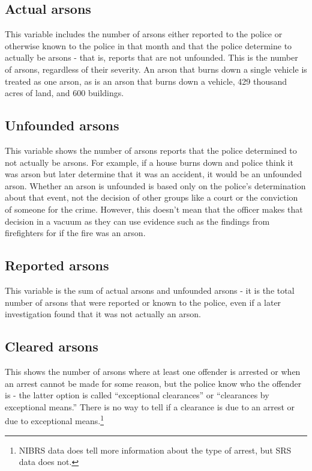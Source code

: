 \documentclass[
]{krantz}
\begin{document}
\subsection{Actual arsons}\label{actual-arsons}

This variable includes the number of arsons either reported
to the police or otherwise known to the police in that month
and that the police determine to actually be arsons - that
is, reports that are not unfounded. This is the number of
arsons, regardless of their severity. An arson that burns
down a single vehicle is treated as one arson, as is an
arson that burns down a vehicle, 429 thousand acres of land,
and 600 buildings.

\subsection{Unfounded arsons}\label{unfounded-arsons}

This variable shows the number of arsons reports that the
police determined to not actually be arsons. For example, if
a house burns down and police think it was arson but later
determine that it was an accident, it would be an unfounded
arson. Whether an arson is unfounded is based only on the
police's determination about that event, not the decision of
other groups like a court or the conviction of someone for
the crime. However, this doesn't mean that the officer makes
that decision in a vacuum as they can use evidence such as
the findings from firefighters for if the fire was an arson.

\subsection{Reported arsons}\label{reported-arsons}

This variable is the sum of actual arsons and unfounded
arsons - it is the total number of arsons that were reported
or known to the police, even if a later investigation found
that it was not actually an arson.

\subsection{Cleared arsons}\label{cleared-arsons}

This shows the number of arsons where at least one offender
is arrested or when an arrest cannot be made for some
reason, but the police know who the offender is - the latter
option is called ``exceptional clearances'' or ``clearances
by exceptional means.'' There is no way to tell if a
clearance is due to an arrest or due to exceptional
means.\footnote{NIBRS data does tell more information about
  the type of arrest, but SRS data does not.}
\end{document}
